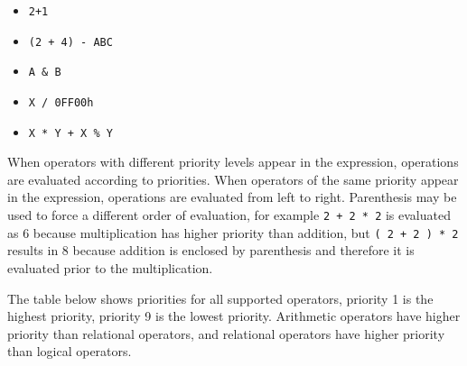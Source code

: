         \begin{itemize}
            \item \texttt{2+1}
            \item \texttt{(2 + 4) - ABC}
            \item \texttt{A \& B}
            \item \texttt{X / 0FF00h}
            \item \texttt{X * Y + X \% Y}
        \end{itemize}

        When operators with different priority levels appear in the expression, operations are evaluated according to priorities. When operators of the same priority appear in the expression, operations are evaluated from left to right. Parenthesis may be used to force a different order of evaluation, for example \texttt{2 + 2 * 2} is evaluated as 6 because multiplication has higher priority than addition, but \texttt{( 2 + 2 ) * 2} results in 8 because addition is enclosed by parenthesis and therefore it is evaluated prior to the multiplication.

        The table below shows priorities for all supported operators, priority 1 is the highest priority, priority 9 is the lowest priority. Arithmetic operators have higher priority than relational operators, and relational operators have higher priority than logical operators.

